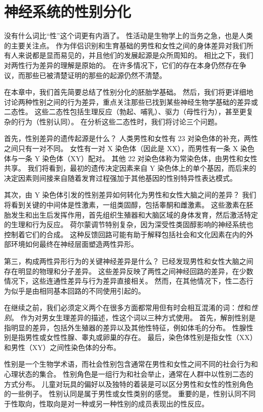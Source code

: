 \chapter{神经系统的性别分化} \label{chap:chap51}

没有什么词比“性”这个词更有内涵了。
性活动是生物学上的当务之急，也是人类的主要关注点。
作为伴侣识别和生育基础的男性和女性之间的身体差异对我们所有人来说都是显而易见的，并且他们的发展起源是众所周知的。
相比之下，我们对两性行为差异的理解是原始的。
在许多情况下，它们的存在本身仍然存在争议，而那些已被清楚证明的那些的起源仍然不清楚。


在本章中，我们首先简要总结了性别分化的胚胎学基础。
然后，我们将更详细地讨论两种性别之间的行为差异，重点关注那些已找到某些神经生物学基础的差异或二态性。
这些二态性包括生理反应（勃起、哺乳）、驱力（母性行为），甚至更复杂的行为（性别认同）。
在分析这些二态性时，我们将讨论三个问题。


首先，性别差异的遗传起源是什么？
人类男性和女性有 23 对染色体的补充，两性之间只有一对不同。
女性有一对 X 染色体（因此是 XX），而男性有一条 X 染色体与一条 Y 染色体（XY）配对。
其他 22 对染色体称为常染色体，由男性和女性共享。
我们将看到，最初的遗传决定因素来自 Y 染色体上的单个基因，而后来的决定因素则间接来自随着发育过程强加于其他基因的性别特异性表达模式。


其次，由 Y 染色体引发的性别差异如何转化为男性和女性大脑之间的差异？
我们将看到关键的中间体是性激素，一组类固醇，包括睾酮和雌激素。
这些激素在胚胎发生和出生后发挥作用，首先组织生殖器和大脑区域的身体发育，然后激活特定的生理和行为反应。
荷尔蒙调节特别复杂，因为深受性类固醇影响的神经系统也控制着它们的合成。
这种反馈回路可能有助于解释包括社会和文化因素在内的外部环境如何最终在神经层面塑造两性异形。


第三，构成两性异形行为的关键神经差异是什么？
已经发现男性和女性大脑之间存在明显的物理和分子差异。
这些差异反映了两性之间神经回路的差异，在少数情况下，这些连通性差异与行为差异直接相关。
然而，在其他情况下，性二态行为似乎是由相同基本回路的不同使用引起的。


在继续之前，我们必须定义两个在很多方面都常用但有时会相互混淆的词：\textit{性}和\textit{性别}。
作为对男女生理差异的描述，性这个词以三种方式使用。
首先，解剖性别是指明显的差异，包括外生殖器的差异以及其他性特征，例如体毛的分布。
性腺性别是指男性或女性性腺、睾丸或卵巢的存在。
最后，染色体性别是指女性（XX）和男性（XY）之间性染色体的分布。


性别是一个生物学术语，而社会性别包含通常在男性和女性之间不同的社会行为和心理状态的集合。
性别角色是一组行为和社会举止，通常在人群中以性别二态的方式分布。
儿童对玩具的偏好以及独特的着装是可以区分男性和女性的性别角色的一些例子。
性别认同是属于男性或女性类别的感觉。
重要的是，性别认同不同于性取向，性取向是对一种或另一种性别的成员表现出的性反应。


